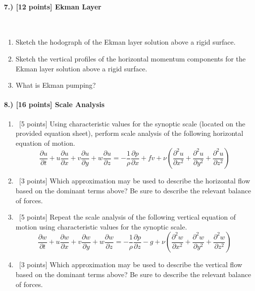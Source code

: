 \documentclass[11pt]{article}
\begin{document}
\newpage
\paragraph{7.) [12 points] Ekman Layer}~\\
\begin{enumerate}[label=\alph*.)]
\item Sketch the hodograph of the Ekman layer solution above a rigid surface.
\vspace{225pt}
\item Sketch the vertical profiles of the horizontal momentum components for the Ekman layer solution above a rigid surface.
\vspace{225pt}
\item What is Ekman pumping?
\end{enumerate}
\newpage

\paragraph{8.) [16 points] Scale Analysis}
\begin{enumerate}[label=\alph*.)]
\item ~[5 points] Using characteristic values for the synoptic scale (located on the provided equation sheet), perform scale analysis of the following horizontal equation of motion.
$$\frac{\partial u}{\partial t} + u \frac{\partial u}{\partial x} + v \frac{\partial u}{\partial y}+ w \frac{\partial u}{\partial z} = - \frac{1}{\rho} \frac{\partial p}{\partial x} + fv + \nu\left(\frac{\partial^2 u}{\partial x^2} + \frac{\partial^2 u}{\partial y^2} + \frac{\partial^2 u}{\partial z^2}\right)$$
\vspace{130pt}
\item ~[3 points] Which approximation may be used to describe the horizontal flow based on the dominant terms above? Be sure to describe the relevant balance of forces.
\vspace{55pt}
\item ~[5 points] Repeat the scale analysis of the following vertical equation of motion using characteristic values for the synoptic scale.
$$\frac{\partial w}{\partial t} + u \frac{\partial w}{\partial x} + v \frac{\partial w}{\partial y}+ w \frac{\partial w}{\partial z} = - \frac{1}{\rho} \frac{\partial p}{\partial z} - g + \nu\left(\frac{\partial^2 w}{\partial x^2} + \frac{\partial^2 w}{\partial y^2} + \frac{\partial^2 w}{\partial z^2}\right)$$
\vspace{130pt}
\item ~[3 points] Which approximation may be used to describe the vertical flow based on the dominant terms above? Be sure to describe the relevant balance of forces.
\end{enumerate}
\newpage
\end{document}
